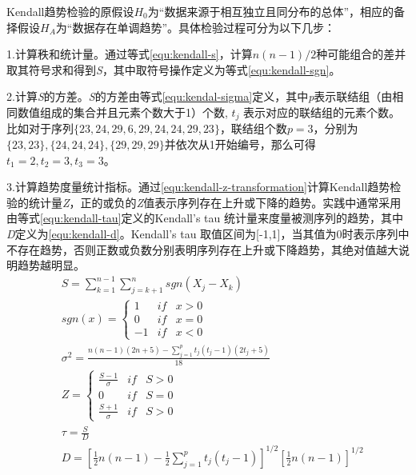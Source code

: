 Kendall趋势检验的原假设$H_{0}$为“数据来源于相互独立且同分布的总体”，相应的备择假设$H_{A}$为“数据存在单调趋势”。具体检验过程可分为以下几步：

1.计算秩和统计量。通过等式\ref{equ:kendall-s}，计算$n(n-1)/2$种可能组合的差并取其符号求和得到\emph{S}，其中取符号操作定义为等式\ref{equ:kendall-sgn}。

2.计算\emph{S}的方差。\emph{S}的方差由等式\ref{equ:kendal-sigma}定义，其中\emph{p}表示联结组（由相同数值组成的集合并且元素个数大于1）个数, $t_{j}$ 表示对应的联结组的元素个数。比如对于序列$\{23, 24, 29, 6, 29, 24, 24, 29, 23\}$，联结组个数$p=3$，分别为$\{23, 23\}, \{24, 24, 24\}, \{29, 29, 29\}$并依次从1开始编号，那么可得$t_{1}=2, t_{2}=3, t_{3}=3$。

3.计算趋势度量统计指标。通过\ref{equ:kendall-z-transformation}计算Kendall趋势检验的统计量\emph{Z}，正的或负的\emph{Z}值表示序列存在上升或下降的趋势。实践中通常采用由等式\ref{equ:kendall-tau}定义的Kendall's tau 统计量来度量被测序列的趋势，其中\emph{D}定义为\ref{equ:kendall-d}。Kendall's tau 取值区间为[-1,1]，当其值为0时表示序列中不存在趋势，否则正数或负数分别表明序列存在上升或下降趋势，其绝对值越大说明趋势越明显。
\begin{subequations}
\begin{align}
& S = \sum_{k=1}^{n-1} \sum_{j=k+1}^{n} sgn(X_{j} - X_{k}) \label{equ:kendall-s} \\[0.1cm]
& sgn(x) = \left\{\begin{matrix}
 1 & if & x>0 \\ 
 0 & if  & x=0 \\ 
 -1 &  if &{} x<0
\end{matrix}\right. \label{equ:kendall-sgn} \\[0.1cm]
& \sigma^{2} = \frac{n(n-1)(2n+5)-\sum_{j=1}^{p}t_{j}(t_{j}-1)(2t_{j}+5)}{18} \label{equ:kendal-sigma} \\[0.1cm]
& Z = \left\{\begin{matrix}
\frac{S-1}{\sigma} & if  & S>0 \\ 
 0 & if & S = 0\\ 
 \frac{S+1}{\sigma}& if  &  S>0
\end{matrix}\right. \label{equ:kendall-z-transformation}\\[0.1cm]
& \tau = \frac{S}{D} \label{equ:kendall-tau} \\[0.1cm]
& D=[\frac{1}{2}n(n-1)-\frac{1}{2}\sum_{j=1}^{p}t_{j}(t_{j}-1)]^{1/2}[\frac{1}{2}n(n-1)]^{1/2} \label{equ:kendall-d}
\end{align}
\end{subequations}


